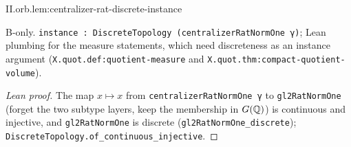 \begin{lemma}
\bonly
{}
\end{lemma}
\begin{tfformal}{II.orb.lem:centralizer-rat-discrete-instance}
\begin{tffidelity}
B-only. \texttt{instance : DiscreteTopology (centralizerRatNormOne γ)}; Lean plumbing for the measure statements, which need discreteness as an instance argument (\texttt{X.quot.def:quotient-measure} and \texttt{X.quot.thm:compact-quotient-volume}).
\end{tffidelity}
\end{tfformal}
\begin{proof}[Lean proof]
The map $x\mapsto x$ from \texttt{centralizerRatNormOne γ} to \texttt{gl2RatNormOne} (forget the two subtype layers, keep the membership in $G(\mathbb{Q})$) is continuous and injective, and \texttt{gl2RatNormOne} is discrete (\texttt{gl2RatNormOne\_discrete}); \texttt{DiscreteTopology.of\_continuous\_injective}.
\end{proof}

